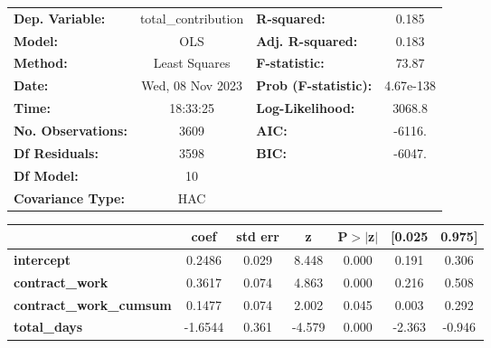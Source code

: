 \begin{center}
\begin{tabular}{lclc}
\toprule
\textbf{Dep. Variable:}                  & total\_contribution & \textbf{  R-squared:         } &     0.185   \\
\textbf{Model:}                          &         OLS         & \textbf{  Adj. R-squared:    } &     0.183   \\
\textbf{Method:}                         &    Least Squares    & \textbf{  F-statistic:       } &     73.87   \\
\textbf{Date:}                           &   Wed, 08 Nov 2023  & \textbf{  Prob (F-statistic):} & 4.67e-138   \\
\textbf{Time:}                           &       18:33:25      & \textbf{  Log-Likelihood:    } &    3068.8   \\
\textbf{No. Observations:}               &          3609       & \textbf{  AIC:               } &    -6116.   \\
\textbf{Df Residuals:}                   &          3598       & \textbf{  BIC:               } &    -6047.   \\
\textbf{Df Model:}                       &            10       & \textbf{                     } &             \\
\textbf{Covariance Type:}                &         HAC         & \textbf{                     } &             \\
\bottomrule
\end{tabular}
\begin{tabular}{lcccccc}
                                         & \textbf{coef} & \textbf{std err} & \textbf{z} & \textbf{P$> |$z$|$} & \textbf{[0.025} & \textbf{0.975]}  \\
\midrule
\textbf{intercept}                       &       0.2486  &        0.029     &     8.448  &         0.000        &        0.191    &        0.306     \\
\textbf{contract\_work}                  &       0.3617  &        0.074     &     4.863  &         0.000        &        0.216    &        0.508     \\
\textbf{contract\_work\_cumsum}          &       0.1477  &        0.074     &     2.002  &         0.045        &        0.003    &        0.292     \\
\textbf{total\_days}                     &      -1.6544  &        0.361     &    -4.579  &         0.000        &       -2.363    &       -0.946     \\

\end{tabular}
\end{center}

